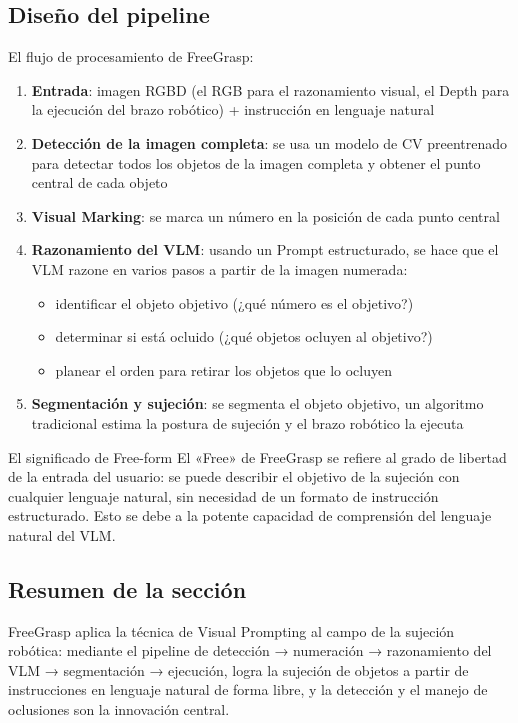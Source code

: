 \documentclass[a4paper]{article}
\begin{document}
\subsection{Diseño del pipeline}

El flujo de procesamiento de FreeGrasp:

\begin{enumerate}
    \item \textbf{Entrada}: imagen RGBD (el RGB para el razonamiento visual, el Depth para la ejecución del brazo robótico) + instrucción en lenguaje natural
    \item \textbf{Detección de la imagen completa}: se usa un modelo de CV preentrenado para detectar todos los objetos de la imagen completa y obtener el punto central de cada objeto
    \item \textbf{Visual Marking}: se marca un número en la posición de cada punto central
    \item \textbf{Razonamiento del VLM}: usando un Prompt estructurado, se hace que el VLM razone en varios pasos a partir de la imagen numerada:
    \begin{itemize}
        \item identificar el objeto objetivo (¿qué número es el objetivo?)
        \item determinar si está ocluido (¿qué objetos ocluyen al objetivo?)
        \item planear el orden para retirar los objetos que lo ocluyen
    \end{itemize}
    \item \textbf{Segmentación y sujeción}: se segmenta el objeto objetivo, un algoritmo tradicional estima la postura de sujeción y el brazo robótico la ejecuta
\end{enumerate}

\begin{importantbox}{El significado de Free-form}
El «Free» de FreeGrasp se refiere al grado de libertad de la entrada del usuario: se puede describir el objetivo de la sujeción con cualquier lenguaje natural, sin necesidad de un formato de instrucción estructurado. Esto se debe a la potente capacidad de comprensión del lenguaje natural del VLM.
\end{importantbox}

\subsection{Resumen de la sección}

FreeGrasp aplica la técnica de Visual Prompting al campo de la sujeción robótica: mediante el pipeline de detección → numeración → razonamiento del VLM → segmentación → ejecución, logra la sujeción de objetos a partir de instrucciones en lenguaje natural de forma libre, y la detección y el manejo de oclusiones son la innovación central.
\end{document}
